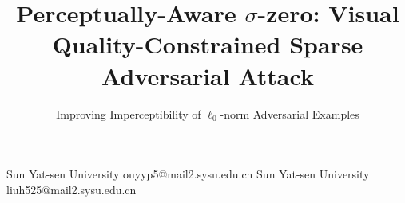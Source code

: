 \documentclass[preprint]{sigplanconf}
\begin{document}




\title{Perceptually-Aware $\sigma$-zero: Visual Quality-Constrained Sparse Adversarial Attack}
\subtitle{Improving Imperceptibility of $\ell_0$-norm Adversarial Examples}

           {Sun Yat-sen University}
           {ouyyp5@mail2.sysu.edu.cn}
           {Sun Yat-sen University}
           {liuh525@mail2.sysu.edu.cn}

\maketitle















\end{document}

